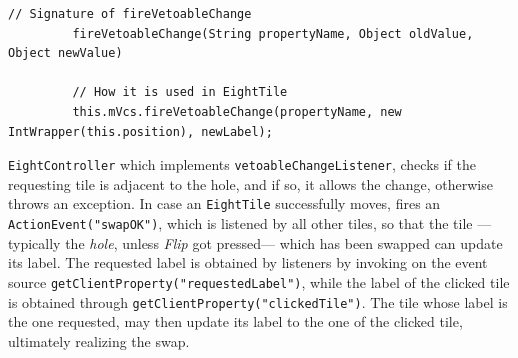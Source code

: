    {
      \begin{lstlisting}[label=lst:fireVetoableChange,captionpos=b,caption={How \lstinline|fireVetoableChange| is used in \lstinline|EightTile|}]
         // Signature of fireVetoableChange
         fireVetoableChange(String propertyName, Object oldValue, Object newValue)

         // How it is used in EightTile
         this.mVcs.fireVetoableChange(propertyName, new IntWrapper(this.position), newLabel);
      \end{lstlisting}
   }

\lstinline|EightController| which implements \lstinline|vetoableChangeListener|, checks if the requesting tile is adjacent to the hole, and if so, it allows the change, otherwise throws an exception.
In case an \lstinline|EightTile| successfully moves, fires an \lstinline|ActionEvent("swapOK")|, which is listened by all other tiles, so that the tile ---typically the \textit{hole}, unless \textit{Flip} got pressed--- which has been swapped can update its label.
The requested label is obtained by listeners by invoking on the event source \lstinline|getClientProperty("requestedLabel")|, while the label of the clicked tile is obtained through \lstinline|getClientProperty("clickedTile")|.
The tile whose label is the one requested, may then update its label to the one of the clicked tile, ultimately realizing the swap.

